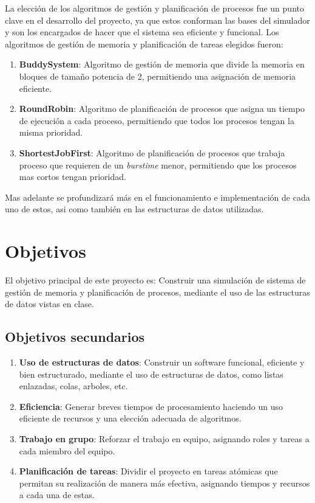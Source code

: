 La elección de los algoritmos de gestión y planificación de procesos fue un punto clave en el desarrollo del proyecto, ya que estos conforman las bases del simulador y son los encargados de hacer que el sistema sea eficiente y funcional. Los algoritmos de gestión de memoria y planificación de tareas elegidos fueron:
\begin{enumerate}
    \item \textbf{BuddySystem}: Algoritmo de gestión de memoria que divide la memoria en bloques de tamaño potencia de 2, permitiendo una asignación de memoria eficiente.
    \item \textbf{RoundRobin}: Algoritmo de planificación de procesos que asigna un tiempo de ejecución a cada proceso, permitiendo que todos los procesos tengan la misma prioridad.
    \item \textbf{ShortestJobFirst}: Algoritmo de planificación de procesos que trabaja proceso que requieren de un \textit{burstime} menor, permitiendo que los procesos mas cortos tengan prioridad.
\end{enumerate}
Mas adelante se profundizará más en el funcionamiento e implementación de cada uno de estos, asi como también en las estructuras de datos utilizadas.

\section{Objetivos}
El objetivo principal de este proyecto es: Construir una simulación de sistema de gestión de memoria y planificación de procesos, mediante el uso de las estructuras de datos vistas en clase.

\subsection{Objetivos secundarios}
\begin{enumerate}
    \item \textbf{Uso de estructuras de datos}: Construir un software funcional, eficiente y bien estructurado, mediante el uso de estructuras de datos, como listas enlazadas, colas, arboles, etc.
    \item \textbf{Eficiencia}: Generar breves tiempos de procesamiento haciendo un uso eficiente de recursos y una elección adecuada de algoritmos.
    \item \textbf{Trabajo en grupo}: Reforzar el trabajo en equipo, asignando roles y tareas a cada miembro del equipo.
    \item \textbf{Planificación de tareas}: Dividir el proyecto en tareas atómicas que permitan su realización de manera más efectiva, asignando tiempos y recursos a cada una de estas.
\end{enumerate}

